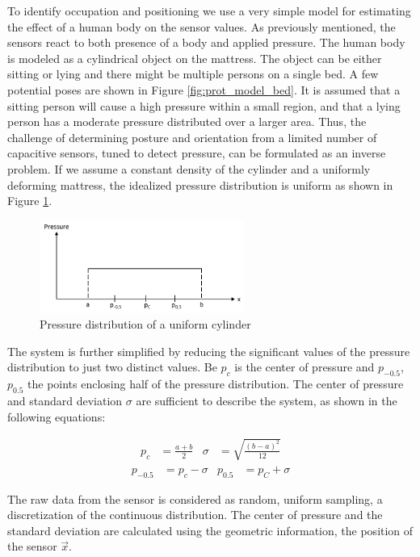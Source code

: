 To identify occupation and positioning we use a very simple model for estimating the effect of a human body on the sensor values. As previously mentioned, the sensors react to both presence of a body and applied pressure. The human body is modeled as a cylindrical object on the mattress. The object can be either sitting or lying and there might be multiple persons on a single bed. A few potential poses are shown in Figure \ref{fig:prot_model_bed}. It is assumed that a sitting person will cause a high pressure within a small region, and that a lying person has a moderate pressure distributed over a larger area. Thus, the challenge of determining posture and orientation from a limited number of capacitive sensors, tuned to detect pressure, can be formulated as an inverse problem. If we assume a constant density of the cylinder and a uniformly deforming mattress, the idealized pressure distribution is uniform as shown in Figure \ref{fig:prot_model_pressure}.

\begin{figure}[ht]
\centering
\includegraphics[width=0.6\textwidth]{images/prot_model_pressure}
\caption{Pressure distribution of a uniform cylinder \cite{braun2012context}}
\label{fig:prot_model_pressure}
\end{figure}

The system is further simplified by reducing the significant values of the pressure distribution to just two distinct values. Be $p_c$ is the center of pressure and $p_{-0.5}$, $p_{0.5}$ the points enclosing half of the pressure distribution. The center of pressure and standard deviation $\sigma$ are sufficient to describe the system, as shown in the following equations:

\begin{align}
p_c&=\frac{a+b}{2} & \sigma&=\sqrt{\frac{(b-a)^2}{12}}
\end{align}
\begin{align}
p_{-0.5}&=p_c-\sigma &	p_{0.5}&=p_C+\sigma
\end{align}

The raw data from the sensor is considered as random, uniform sampling, a discretization of the continuous distribution. The center of pressure and the standard deviation are calculated using the geometric information, the position of the sensor $\overrightarrow{x}$.

